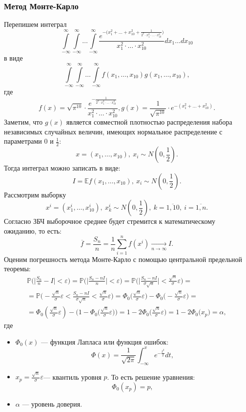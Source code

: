 \documentclass[11pt]{article}
\begin{document}
\subsubsection{Метод Монте-Карло}
Перепишем интеграл 
\[ \int\limits_{-\infty}^\infty \int\limits_{-\infty}^\infty\dots  \int\limits_{-\infty}^\infty \frac{e^{-\bigg(x_1^2 + \dots + x_{10}^2 + \frac{1}{2^7\cdot x_1^2 \cdot \dots \cdot x_{10}^2}\bigg)}}{x_1^2 \cdot \dots \cdot x_{10}^2}dx_1\dots dx_{10} \] 
в виде
\[ \int\limits_{-\infty}^\infty \int\limits_{-\infty}^\infty\dots  \int\limits_{-\infty}^\infty f(x_1,\dots,x_{10})g(x_1,\dots,x_{10}), \]
где 
\[ f(x) = \sqrt{\pi^{10}}\cdot \frac{e^{-\frac{1}{2^7\cdot x_1^2 \cdot \dots \cdot x_{10}^2}}}{x_1^2 \cdot \dots \cdot x_{10}^2}, g(x) = \frac{1}{\sqrt{\pi^{10}}}\cdot e^{-(x_1^2 + \dots + x_{10}^2)}. \]
Заметим, что $g(x)$ является совместной плотностью распределения набора независимых случайных величин, имеющих нормальное распределение с параметрами 0 и $\frac{1}{2}$:
\[ x = (x_1,\dots,x_{10}), \ x_i \sim N(0,\frac{1}{2}). \]
Тогда интеграл можно записать в виде:
\[ I = \mathbb{E}f(x_1,\dots,x_{10}), \ x_i \sim N(0,\frac{1}{2}). \]
Рассмотрим выборку
\[x^i = (x^i_1,\dots, x^i_{10}), \ x_k^i \sim N(0,\frac{1}{2}), \ k = \overline{1,10}, \ i = \overline{1,n}. \]
Согласно ЗБЧ выборочное среднее будет стремится к математическому ожиданию, то есть:
\[ \overline{f} = \frac{S_n}{n} = \frac{1}{n} \sum_{i = 1}^{n}f(x^i) \underset{n \rightarrow \infty}{\longrightarrow} I. \]
Оценим погрешность метода Монте-Карло с помощью центральной предельной теоремы:
\begin{eqnarray*}
\mathbb{P}\bigg(\bigg|\frac{S_n}{n} - I \bigg| < \varepsilon \bigg) = \mathbb{P}\bigg(\bigg|\frac{S_n - nI}{n} \bigg| < \varepsilon\bigg) = \mathbb{P}\bigg(\bigg|\frac{S_n - nI}{\sigma \sqrt{n}}\bigg| < \frac{\sqrt{n}}{\sigma}\varepsilon \bigg) = \\ 
=\mathbb{P}\bigg( -\frac{\sqrt{n}}{\sigma}\varepsilon  < \frac{S_n - nI}{\sigma\sqrt{n}} < \frac{\sqrt{n}}{\sigma}\varepsilon\bigg) = \Phi_0\bigg(\frac{\sqrt{n}}{\sigma}\varepsilon\bigg) - \Phi_0\bigg(-\frac{\sqrt{n}}{\sigma}\varepsilon\bigg) = \\
= \Phi_0(\frac{\sqrt{n}}{\sigma}\varepsilon) - \bigg(1 - \Phi_0\bigg(\frac{\sqrt{n}}{\sigma}\varepsilon\bigg) \bigg) = 1 - 2\Phi_0\bigg(\frac{\sqrt{n}}{\sigma}\varepsilon\bigg) = 1 - 2\Phi_0\bigg(x_p\bigg) = \alpha,
\end{eqnarray*}
где
\begin{itemize}
	\item [\textbullet]$\Phi_0(x)$ --- функция Лапласа или функция ошибок:
	\[ \Phi(x) = \frac{1}{\sqrt{2\pi}}\int_{-\infty}^{x}e^{-\frac{t^2}{2}}dt,\]
	\item [\textbullet] $x_p = \frac{\sqrt{n}}{\sigma}\varepsilon$--- квантиль уровня $p$. То есть решение уравнения:
	\[ \Phi_0(x_p) = p,  \]
	\item [\textbullet] $\alpha$ --- уровень доверия. 
\end{itemize}
\end{document}
